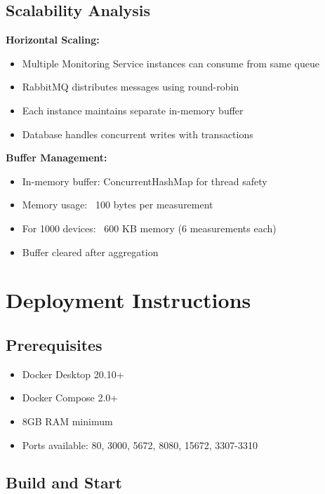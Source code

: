 \documentclass[12pt,a4paper]{article}
\begin{document}
\subsection{Scalability Analysis}

\textbf{Horizontal Scaling:}
\begin{itemize}
    \item Multiple Monitoring Service instances can consume from same queue
    \item RabbitMQ distributes messages using round-robin
    \item Each instance maintains separate in-memory buffer
    \item Database handles concurrent writes with transactions
\end{itemize}

\textbf{Buffer Management:}
\begin{itemize}
    \item In-memory buffer: ConcurrentHashMap for thread safety
    \item Memory usage: ~100 bytes per measurement
    \item For 1000 devices: ~600 KB memory (6 measurements each)
    \item Buffer cleared after aggregation
\end{itemize}

\newpage


\section{Deployment Instructions}

\subsection{Prerequisites}

\begin{itemize}
    \item Docker Desktop 20.10+
    \item Docker Compose 2.0+
    \item 8GB RAM minimum
    \item Ports available: 80, 3000, 5672, 8080, 15672, 3307-3310
\end{itemize}

\subsection{Build and Start}
\end{document}

